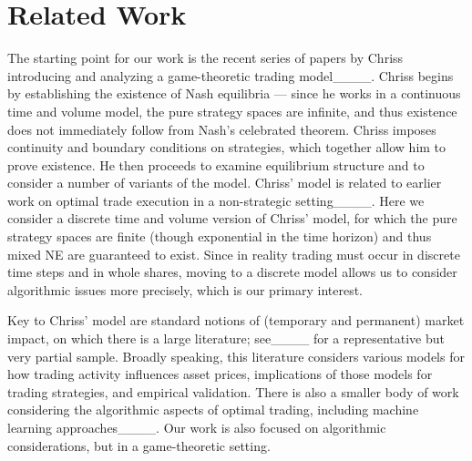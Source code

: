 \section{Related Work}
The starting point for our work is the recent series of papers by Chriss introducing and analyzing a game-theoretic trading model____. Chriss begins by establishing the existence of Nash equilibria --- since he works in a continuous time and volume model, the pure strategy spaces are infinite, and thus existence does not immediately follow from Nash's celebrated theorem. Chriss imposes continuity and boundary conditions on strategies, which together allow him to prove existence. He then proceeds to examine equilibrium structure and to consider a number of variants of the model. 
Chriss' model is related to earlier work on optimal trade execution in a non-strategic setting____.
Here we consider a discrete time and volume version of Chriss' model, for which the pure strategy spaces are finite (though exponential in the time horizon) and thus mixed NE are guaranteed to exist. Since in reality trading must occur in discrete time steps and in whole shares, moving to a discrete model allows us to consider algorithmic issues more precisely, which is our primary interest.

Key to Chriss' model are standard notions of (temporary and permanent) market impact, on which there is a large literature;
see____ for a representative but very partial sample. Broadly speaking, this literature considers various models for how trading activity influences asset prices, implications of those models for trading strategies, and empirical validation. There is also a smaller body of work considering the algorithmic aspects of optimal trading, including machine learning approaches____. Our work is also focused on algorithmic considerations, but in a game-theoretic setting.